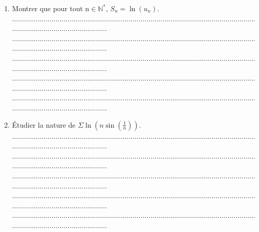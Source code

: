 \documentclass{article}
\begin{document}
\begin{footnotesize}
\begin{enumerate}
    \begin{enumerate}
        \item Montrer que pour tout n$\in \mathbb{N^{*}}$, $S_{n}=\ln(u_{n})$.\newline\newline
        ...........................................................................................................................................................................\newline
        ...........................................................................................................................................................................\newline
        ...........................................................................................................................................................................\newline
        ...........................................................................................................................................................................\newline
        ...........................................................................................................................................................................\newline\newline
        \item Étudier la nature de $\Sigma\ln(n\sin(\frac{1}{n}))$.\newline\newline
        ...........................................................................................................................................................................\newline
        ...........................................................................................................................................................................\newline
        ...........................................................................................................................................................................\newline
        ...........................................................................................................................................................................\newline
        ...........................................................................................................................................................................\newline

\end{enumerate}
\end{enumerate}
\end{footnotesize}
\end{document}
